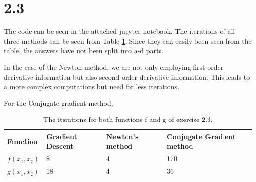 \documentclass{article}
\begin{document}
\section*{2.3}
\begin{table}[H]
	The code can be seen in the attached jupyter notebook.
	The iterations of all three methods can be seen from Table \ref{tab:iterations}. Since they can easily been seen from the table, the answers have not been split into a-d parts.
	
	In the case of the Newton method, we are not only employing first-order derivative information but also second order derivative information. This leads to a more complex computations but need for less iterations. 
	
	For the Conjugate gradient method, 
	\centering
	\caption{The iterations for both functions f and g of exercise 2.3.}
	\label{tab:iterations}
	\begin{tabular}{|l|l|l|l|}
		\hline
		Function   & Gradient Descent & Newton’s method & Conjugate Gradient method \\ \hline
		$f(x_1,x_2)$ & 8                & 4               & 170                       \\ \hline
		$g(x_1,x_2)$ & 18               & 4               & 36                        \\ \hline
	\end{tabular}
\end{table}
\end{document}
